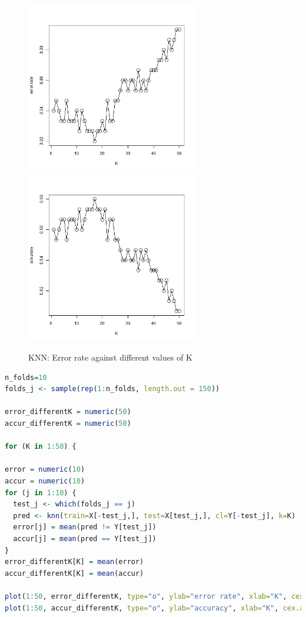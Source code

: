 \documentclass{article}
\begin{document}
\begin{figure}[H]
    \centering
    \includegraphics[width=7.5cm]{images/knn_error.png}
    \includegraphics[width=7.5cm]{images/knn_accur.png}
    \caption{KNN: Error rate against different values of K}
\end{figure}
\begin{lstlisting}[language=R]
n_folds=10
folds_j <- sample(rep(1:n_folds, length.out = 150))

error_differentK = numeric(50)
accur_differentK = numeric(50)

for (K in 1:50) {

error = numeric(10)
accur = numeric(10)
for (j in 1:10) {
  test_j <- which(folds_j == j)
  pred <- knn(train=X[-test_j,], test=X[test_j,], cl=Y[-test_j], k=K)
  error[j] = mean(pred != Y[test_j])
  accur[j] = mean(pred == Y[test_j])
}
error_differentK[K] = mean(error)
accur_differentK[K] = mean(accur)

plot(1:50, error_differentK, type="o", ylab="error rate", xlab="K", cex.axis=1, cex=2)
plot(1:50, accur_differentK, type="o", ylab="accuracy", xlab="K", cex.axis=1, cex=2)

\end{lstlisting}
\end{document}
